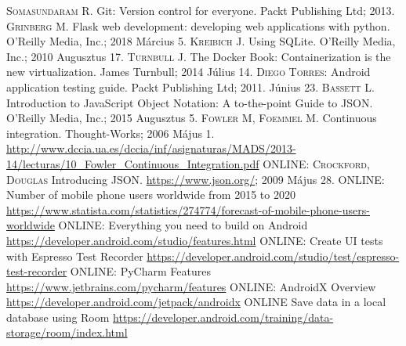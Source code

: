 \documentclass{thesis-ekf}
\theoremstyle{definition}
\theoremstyle{remark}
\begin{document}
\begin{thebibliography}{1}
	 \textsc{Somasundaram R.} Git: Version control for everyone. Packt Publishing Ltd; 2013.
	\smallskip
	 \textsc{Grinberg M.} Flask web development: developing web applications with python. O'Reilly Media, Inc.; 2018 Március 5.
	\smallskip
	 \textsc{Kreibich J.} Using SQLite. O'Reilly Media, Inc.; 2010 Augusztus 17.
	\smallskip
	 \textsc{Turnbull J.} The Docker Book: Containerization is the new virtualization. James Turnbull; 2014 Július 14.
	\smallskip
	 \textsc{Diego Torres}: Android application testing guide. Packt Publishing Ltd; 2011. Június 23.
	\smallskip
	 \textsc{Bassett L.} Introduction to JavaScript Object Notation: A to-the-point Guide to JSON. O'Reilly Media, Inc.; 2015 Augusztus 5.
	\smallskip
	 \textsc{Fowler M, Foemmel M.} Continuous integration. Thought-Works; 2006 Május 1. \url{http://www.dccia.ua.es/dccia/inf/asignaturas/MADS/2013-14/lecturas/10_Fowler_Continuous_Integration.pdf}
	\smallskip
	 \textsc{ONLINE: Crockford, Douglas} Introducing JSON. \url{https://www.json.org/}; 2009 Május 28.
	\smallskip
	 \textsc{ONLINE}: Number of mobile phone users worldwide from 2015 to 2020 \url{https://www.statista.com/statistics/274774/forecast-of-mobile-phone-users-worldwide}
	\smallskip
	 \textsc{ONLINE}: Everything you need to build on Android \url{https://developer.android.com/studio/features.html}
	\smallskip
	 \textsc{ONLINE}: Create UI tests with Espresso Test Recorder \url{https://developer.android.com/studio/test/espresso-test-recorder}
	\smallskip
	 \textsc{ONLINE}: PyCharm Features \url{https://www.jetbrains.com/pycharm/features}
	\smallskip
	 \textsc{ONLINE}: AndroidX Overview \url{https://developer.android.com/jetpack/androidx}
	\smallskip
	 \textsc{ONLINE} Save data in a local database using Room \url{https://developer.android.com/training/data-storage/room/index.html}
	\smallskip
\end{thebibliography}
\end{document}
